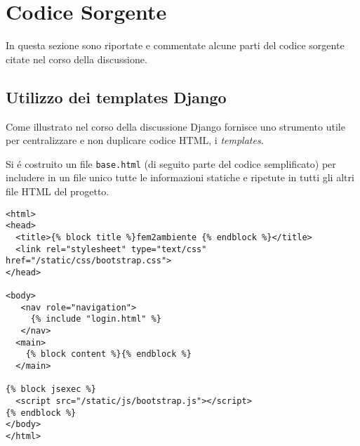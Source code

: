 \chapter{Codice Sorgente}

In questa sezione sono riportate e commentate alcune parti del codice sorgente citate nel corso della discussione.

\section*{Utilizzo dei templates Django}
\label{app:templates}

Come illustrato nel corso della discussione Django fornisce uno strumento utile per centralizzare e non duplicare codice HTML, i \emph{templates}.

Si é costruito un file \texttt{base.html} (di seguito parte del codice semplificato) per includere in un file unico tutte le informazioni statiche e ripetute in tutti gli altri file HTML del progetto.

\begin{footnotesize}
\begin{verbatim}
<html>
<head>
  <title>{% block title %}fem2ambiente {% endblock %}</title>
  <link rel="stylesheet" type="text/css" href="/static/css/bootstrap.css">
</head>

<body>
   <nav role="navigation">                        
     {% include "login.html" %}
   </nav>
  <main>
    {% block content %}{% endblock %}
  </main>

{% block jsexec %}
  <script src="/static/js/bootstrap.js"></script>
{% endblock %}
</body>
</html>
\end{verbatim}
\end{footnotesize}

